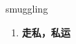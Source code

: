 
\begin{frame}
{\huge smuggling}
\begin{center}
\begin{enumerate}\Large
  \item \textbf{走私，私运}
\end{enumerate}
\end{center}
\end{frame}
